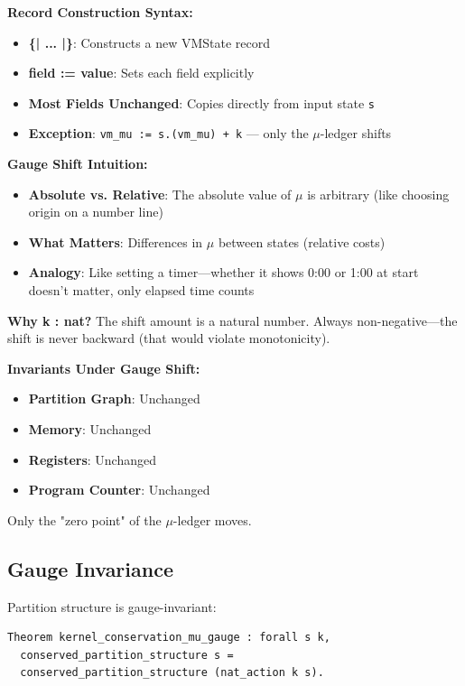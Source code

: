 \textbf{Record Construction Syntax:}
\begin{itemize}
    \item \textbf{\{| ... |\}}: Constructs a new VMState record
    \item \textbf{field := value}: Sets each field explicitly
    \item \textbf{Most Fields Unchanged}: Copies directly from input state \texttt{s}
    \item \textbf{Exception}: \texttt{vm\_mu := s.(vm\_mu) + k} — only the $\mu$-ledger shifts
\end{itemize}

\textbf{Gauge Shift Intuition:}
\begin{itemize}
    \item \textbf{Absolute vs. Relative}: The absolute value of $\mu$ is arbitrary (like choosing origin on a number line)
    \item \textbf{What Matters}: Differences in $\mu$ between states (relative costs)
    \item \textbf{Analogy}: Like setting a timer—whether it shows 0:00 or 1:00 at start doesn't matter, only elapsed time counts
\end{itemize}

\textbf{Why k : nat?} The shift amount is a natural number. Always non-negative---the shift is never backward (that would violate monotonicity).

\textbf{Invariants Under Gauge Shift:}
\begin{itemize}
    \item \textbf{Partition Graph}: Unchanged
    \item \textbf{Memory}: Unchanged
    \item \textbf{Registers}: Unchanged
    \item \textbf{Program Counter}: Unchanged
\end{itemize}
Only the "zero point" of the $\mu$-ledger moves.

\subsection{Gauge Invariance}

Partition structure is gauge-invariant:
\begin{lstlisting}
Theorem kernel_conservation_mu_gauge : forall s k,
  conserved_partition_structure s = 
  conserved_partition_structure (nat_action k s).
\end{lstlisting}

